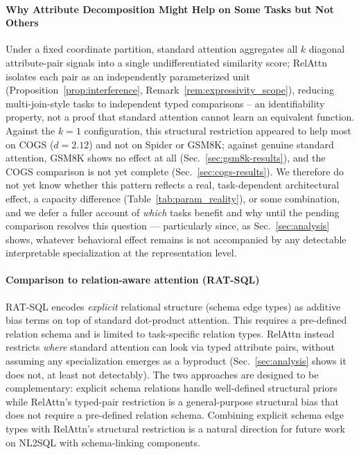 \documentclass[review]{elsarticle}
\begin{document}
\paragraph{Why Attribute Decomposition Might Help on Some Tasks but Not Others}
Under a fixed coordinate partition, standard attention aggregates all $k$ diagonal attribute-pair signals into a single undifferentiated similarity score; RelAttn isolates each pair as an independently parameterized unit (Proposition~\ref{prop:interference}, Remark~\ref{rem:expressivity_scope}), reducing multi-join-style tasks to independent typed comparisons -- an identifiability property, not a proof that standard attention cannot learn an equivalent function. Against the $k{=}1$ configuration, this structural restriction appeared to help most on COGS ($d{=}2.12$) and not on Spider or GSM8K; against genuine standard attention, GSM8K shows no effect at all (Sec.~\ref{sec:gsm8k-results}), and the COGS comparison is not yet complete (Sec.~\ref{sec:cogs-results}). We therefore do not yet know whether this pattern reflects a real, task-dependent architectural effect, a capacity difference (Table~\ref{tab:param_reality}), or some combination, and we defer a fuller account of \emph{which} tasks benefit and why until the pending comparison resolves this question --- particularly since, as Sec.~\ref{sec:analysis} shows, whatever behavioral effect remains is not accompanied by any detectable interpretable specialization at the representation level.

\paragraph{Comparison to relation-aware attention (RAT-SQL)}
RAT-SQL encodes \emph{explicit} relational structure (schema edge types) as additive bias terms on top of standard dot-product attention. This requires a pre-defined relation schema and is limited to task-specific relation types. RelAttn instead restricts \emph{where} standard attention can look via typed attribute pairs, without assuming any specialization emerges as a byproduct (Sec.~\ref{sec:analysis} shows it does not, at least not detectably). The two approaches are designed to be complementary: explicit schema relations handle well-defined structural priors while RelAttn's typed-pair restriction is a general-purpose structural bias that does not require a pre-defined relation schema. Combining explicit schema edge types with RelAttn's structural restriction is a natural direction for future work on NL2SQL with schema-linking components.
\end{document}
